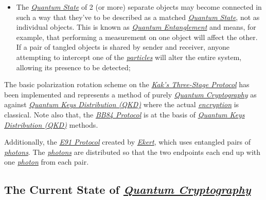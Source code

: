 \documentclass[conference]{IEEEtran}
\begin{document}
\begin{itemize}
    \item The \href{https://en.wikipedia.org/wiki/Quantum_state}{\textit{Quantum State}} of 2 (or more) separate objects may become connected in such a way that they've to be described as a matched \href{https://en.wikipedia.org/wiki/Quantum_state}{\textit{Quantum State}}, not as individual objects. This is known as \href{https://en.wikipedia.org/wiki/Quantum_entanglement}{\textit{Quantum Entanglement}} and means, for example, that performing a measurement on one object will affect the other. If a pair of tangled objects is shared by sender and receiver, anyone attempting to intercept one of the \href{https://en.wikipedia.org/wiki/Microparticle}{\textit{particles}} will alter the entire system, allowing its presence to be detected;
\end{itemize}

\vspace{6pt}

The basic polarization rotation scheme on the \href{https://en.wikipedia.org/wiki/Subhash_Kak}{\textit{Kak's Three-Stage Protocol}} has been implemented and represents a method of purely \href{https://en.wikipedia.org/wiki/Quantum_cryptography}{\textit{Quantum Cryptography}} as against \href{https://en.wikipedia.org/wiki/Quantum_key_distribution}{\textit{Quantum Keys Distribution (QKD)}} where the actual \href{https://en.wikipedia.org/wiki/Encryption}{\textit{encryption}} is classical. Note also that, the \href{https://en.wikipedia.org/wiki/BB84}{\textit{BB84 Protocol}} is at the basis of \href{https://en.wikipedia.org/wiki/Quantum_key_distribution}{\textit{Quantum Keys Distribution (QKD)}} methods.

\vspace{4pt}

Additionally, the \href{https://en.wikipedia.org/wiki/Quantum_key_distribution#E91_protocol:_Artur_Ekert_.281991.29}{\textit{E91 Protocol}} created by \href{https://en.wikipedia.org/wiki/Artur_Ekert}{\textit{Ekert}}, which uses entangled pairs of \href{https://en.wikipedia.org/wiki/Photon}{\textit{photons}}. The \href{https://en.wikipedia.org/wiki/Photon}{\textit{photons}} are distributed so that the two endpoints each end up with one \href{https://en.wikipedia.org/wiki/Photon}{\textit{photon}} from each pair.

\newpage

\subsection{The Current State of \href{https://en.wikipedia.org/wiki/Quantum_cryptography}{\textit{Quantum Cryptography}}}
\end{document}
